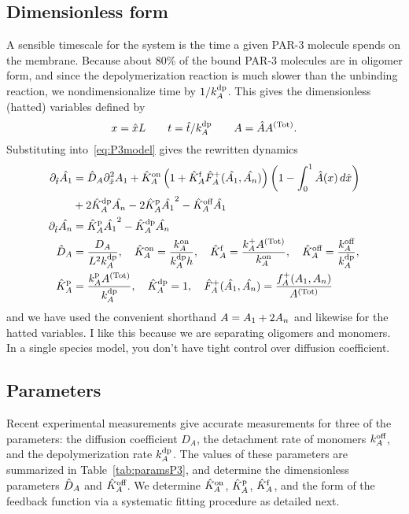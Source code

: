 \documentclass[11pt]{article}
\newcommand{\red}[1]{\color{red}#1\normalcolor}
\newcommand{\6}[1]{#1_{\text{6}}}
\newcommand{\3}[1]{#1_{\text{3}}}
\newcommand{\Tot}[1]{#1^\text{(Tot)}}
\newcommand{\A}[1]{#1_A}
\begin{document}
\subsection{Dimensionless form}
A sensible timescale for the system is the time a given PAR-3 molecule spends on the membrane. Because about 80\% of the bound PAR-3 molecules are in oligomer form, and since the depolymerization reaction is much slower than the unbinding reaction, we nondimensionalize time by $1/\A{\kdp}$. This gives the dimensionless (hatted) variables defined by
\begin{equation*}
x = \hat{x} L \qquad t= \hat{t}/\A{\kdp} \qquad A= \hat{A}\Tot{A}.
\end{equation*}
Substituting into\ \eqref{eq:P3model} gives the rewritten dynamics
\begin{subequations}
\label{eq:PAR3gen}
\begin{align}
\nonumber
\Dthat \hat{\MA} & = \DhatA \Dxhat^2 \MA +\KhatonA \left(1+\KhatfA \hat F_A^+(\hat \MA, \hat \PA) \right)\left(1 - \int_0^1 \hat A(x) \, d\hat{x} \right) \\ 
\label{eq:Amono} &+ 2\KhatdpA \hat{\PA}-2\KhatpA \hat{\MA}^2 - \KhatoffA \hat{\MA} \\
\label{eq:Apoly}
\Dthat \hat{\PA} & =\KhatpA \hat{\MA}^2- \KhatdpA \hat{\PA} \\ 
\label{eq:paramsND}
\DhatA &=\frac{\A{D}}{L^2 \A{\kdp}}, \quad \KhatonA=\frac{\A{\kon}}{\A{\kdp} h }, \quad \KhatfA = \frac{\A{\kf}\Tot{A}}{\A{\kon}}, \quad  \KhatoffA = \frac{\A{\koff}}{\A{\kdp}}, \\ \nonumber \KhatpA &= \frac{\A{\kp} \Tot{A}}{\A{\kdp}}, \quad \KhatdpA=1, \quad \hat F_A^+(\hat \MA,\hat \PA) =\frac{\A{f}^+(\MA,\PA)}{\Tot{A}}
\end{align}
\end{subequations}
and we have used the convenient shorthand $A=A_1 + 2 A_n$ and likewise for the hatted variables. \red{I like this because we are separating oligomers and monomers. In a single species model, you don't have tight control over diffusion coefficient.}

\subsection{Parameters \label{sec:paramsP3}}
Recent experimental measurements \cite{lang2023oligomerization} give accurate measurements for three of the parameters: the diffusion coefficient $D_A$, the detachment rate of monomers $k^\text{off}_A$, and the depolymerization rate $k^\text{dp}_A$. The values of these parameters are summarized in Table\ \ref{tab:paramsP3}, and determine the dimensionless parameters $\hat{D}_A$ and $\hat{K}^\text{off}_A$. We determine $\hat{K}^\text{on}_A$, $\hat{K}^\text{p}_A$, $\hat{K}^\text{f}_A$, and the form of the feedback function via a systematic fitting procedure as detailed next.
\end{document}
